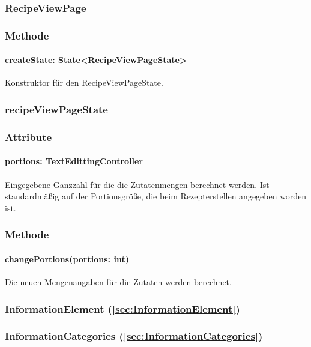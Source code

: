 \documentclass{entwurfsheft}
\begin{document}
\subsubsection{RecipeViewPage}\label{sec:RecipeViewPage}
\subsubsection*{Methode}
\paragraph*{createState: State<RecipeViewPageState>} Konstruktor für den RecipeViewPageState.

\subsubsection{recipeViewPageState}\label{sec:RecipeViewPageState}
\subsubsection*{Attribute}
\paragraph*{portions: TextEdittingController} Eingegebene Ganzzahl für die die Zutatenmengen berechnet werden. Ist standardmäßig auf der Portionsgröße, die beim Rezepterstellen angegeben worden ist.

\subsubsection*{Methode}
\paragraph*{changePortions(portions: int)} Die neuen Mengenangaben für die Zutaten werden berechnet.

\subsubsection*{InformationElement (\ref{sec:InformationElement})}

\subsubsection{InformationCategories (\ref{sec:InformationCategories})}
\end{document}
